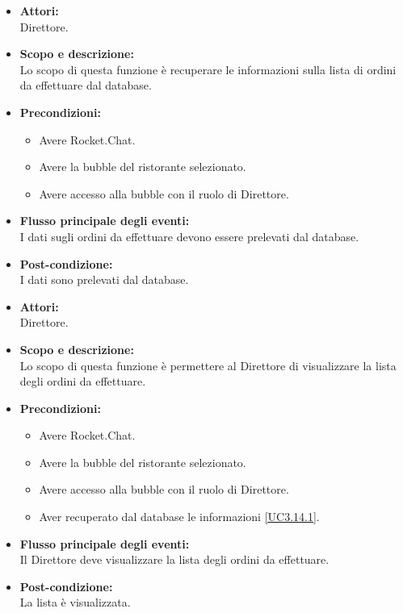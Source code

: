 \begin{itemize}
	\item \textbf{Attori:}
	\\Direttore.
	\item \textbf{Scopo e descrizione:} 
	\\Lo scopo di questa funzione è recuperare le informazioni sulla lista di ordini da effettuare dal database.
	\item \textbf{Precondizioni:}
	\begin{itemize}
		\item Avere Rocket.Chat.
		\item Avere la bubble del ristorante selezionato.
		\item Avere accesso alla bubble con il ruolo di Direttore.
	\end{itemize}
	\item \textbf{Flusso principale degli eventi:}
	\\I dati sugli ordini da effettuare devono essere prelevati dal database.
	\item \textbf{Post-condizione:}
	\\I dati sono prelevati dal database.
\end{itemize}


\begin{itemize}
	\item \textbf{Attori:}
	\\Direttore.
	\item \textbf{Scopo e descrizione:} 
	\\Lo scopo di questa funzione è permettere al Direttore di visualizzare la lista degli ordini da effettuare.
	\item \textbf{Precondizioni:}
	\begin{itemize}
		\item Avere Rocket.Chat.
		\item Avere la bubble del ristorante selezionato.
		\item Avere accesso alla bubble con il ruolo di Direttore.
		\item Aver recuperato dal database le informazioni \ref{UC3.14.1}.
	\end{itemize}
	\item \textbf{Flusso principale degli eventi:}
	\\Il Direttore deve visualizzare la lista degli ordini da effettuare.
	\item \textbf{Post-condizione:}
	\\La lista è visualizzata.
\end{itemize}

